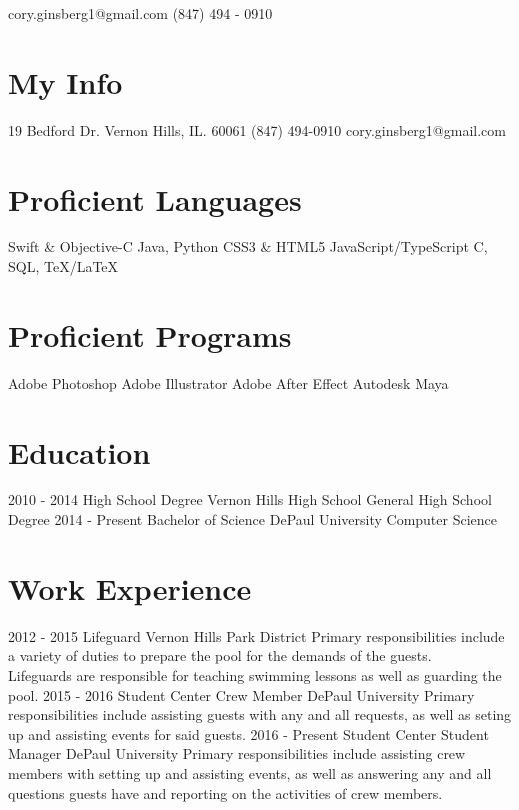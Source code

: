 \documentclass[]{resume-class}
\begin{document}
       {cory.ginsberg1@gmail.com \textbullet \hspace{0.01cm} (847) 494 - 0910}

\doublespacing

\begin{aside}
  \section{My Info}
    19 Bedford Dr.
    Vernon Hills, IL.
    60061
    (847) 494-0910
    cory.ginsberg1@gmail.com
  \section{Proficient Languages}
    Swift \& Objective-C
    Java, Python
    CSS3 \& HTML5
    JavaScript/TypeScript
    C, SQL, TeX/LaTeX
  \section{Proficient Programs}
    Adobe Photoshop
    Adobe Illustrator
    Adobe After Effect
    Autodesk Maya
\end{aside}

\section{Education}

\begin{entrylist}
  \entry
    {2010 - 2014}
    {High School Degree}
    {Vernon Hills High School}
    {General High School Degree}
  \entry
    {2014 - Present}
    {Bachelor of Science}
    {DePaul University}
    {Computer Science}
\end{entrylist}

\section{Work Experience}

\begin{entrylist}
  \entry
    {2012 - 2015}
    {Lifeguard}
    {Vernon Hills Park District}
    {Primary responsibilities include a variety of duties to prepare the pool for the demands of the guests.\\
Lifeguards are responsible for teaching swimming lessons as well as guarding the pool.}
  \entry
    {2015 - 2016}
    {Student Center Crew Member}
    {DePaul University}
    {Primary responsibilities include assisting guests with any and all requests, as well as seting up and assisting events for said guests.}
  \entry
    {2016 - Present}
    {Student Center Student Manager}
    {DePaul University}
    {Primary responsibilities include assisting crew members with setting up and assisting events, as well as answering any and all questions guests have and reporting on the activities of crew members.}
\end{entrylist}
\end{document}
